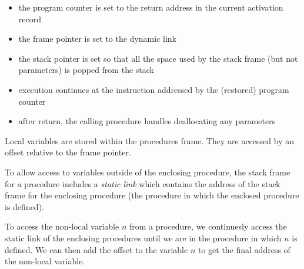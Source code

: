 \begin{itemize}
    \item the program counter is set to the return address in the current activation record
    \item the frame pointer is set to the dynamic link
    \item the stack pointer is set so that all the space used by the stack frame (but not 
    parameters) is popped from the stack
    \item execution continues at the instruction addressed by the (restored) program counter
    \item after return, the calling procedure handles deallocating any parameters
\end{itemize}

Local variables are stored within the procedures frame. They are accessed by an offset 
relative to the frame pointer.

To allow access to variables outside of the enclosing procedure, the stack frame for a 
procedure includes a \textit{static link} which contains the address of the stack frame 
for the enclosing procedure (the procedure in which the enclosed procedure is defined).

To access the non-local variable $n$ from a procedure, we continuesly access the static link 
of the enclosing procedures until we are in the procedure in which $n$ is defined. We can then
add the offset to the variable $n$ to get the final address of the non-local variable.
